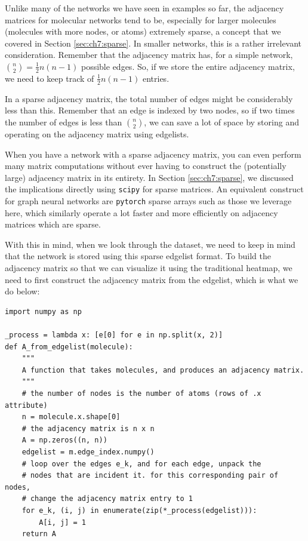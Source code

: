 Unlike many of the networks we have seen in examples so far, the adjacency matrices for molecular networks tend to be, especially for larger molecules (molecules with more nodes, or atoms) extremely sparse, a concept that we covered in Section \ref{sec:ch7:sparse}. In smaller networks, this is a rather irrelevant consideration. Remember that the adjacency matrix has, for a simple network, $\binom n 2 = \frac{1}{2}n(n - 1)$ possible edges. So, if we store the entire adjacency matrix, we need to keep track of $\frac{1}{2}n (n - 1)$ entries. 

In a sparse adjacency matrix, the total number of edges might be considerably less than this. Remember that an edge is indexed by two nodes, so if two times the number of edges is less than $\binom n 2$, we can save a lot of space by storing and operating on the adjacency matrix using edgelists.

When you have a network with a sparse adjacency matrix, you can even perform many matrix computations without ever having to construct the (potentially large) adjacency matrix in its entirety. In Section \ref{sec:ch7:sparse}, we discussed the implications directly using \texttt{scipy} for sparse matrices. An equivalent construct for graph neural networks are \texttt{pytorch} sparse arrays such as those we leverage here, which similarly operate a lot faster and more efficiently on adjacency matrices which are sparse.

With this in mind, when we look through the dataset, we need to keep in mind that the network is stored using this sparse edgelist format. To build the adjacency matrix so that we can visualize it using the traditional heatmap, we need to first construct the adjacency matrix from the edgelist, which is what we do below:

\begin{lstlisting}[style=python]
import numpy as np

_process = lambda x: [e[0] for e in np.split(x, 2)]
def A_from_edgelist(molecule):
    """
    A function that takes molecules, and produces an adjacency matrix.
    """
    # the number of nodes is the number of atoms (rows of .x attribute)
    n = molecule.x.shape[0]
    # the adjacency matrix is n x n
    A = np.zeros((n, n))
    edgelist = m.edge_index.numpy()
    # loop over the edges e_k, and for each edge, unpack the 
    # nodes that are incident it. for this corresponding pair of nodes, 
    # change the adjacency matrix entry to 1
    for e_k, (i, j) in enumerate(zip(*_process(edgelist))):
        A[i, j] = 1
    return A
\end{lstlisting}


